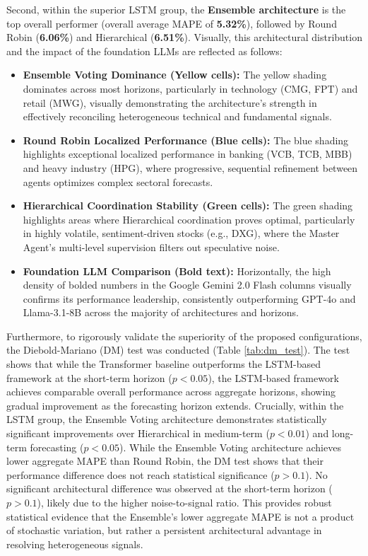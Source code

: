 \documentclass{ieeeaccess}
\begin{document}
Second, within the superior LSTM group, the \textbf{Ensemble architecture} is the top overall performer (overall average MAPE of \textbf{5.32\%}), followed by Round Robin (\textbf{6.06\%}) and Hierarchical (\textbf{6.51\%}). Visually, this architectural distribution and the impact of the foundation LLMs are reflected as follows:
\begin{itemize}
    \item \textbf{Ensemble Voting Dominance (Yellow cells):} The yellow shading dominates across most horizons, particularly in technology (CMG, FPT) and retail (MWG), visually demonstrating the architecture's strength in effectively reconciling heterogeneous technical and fundamental signals.
    \item \textbf{Round Robin Localized Performance (Blue cells):} The blue shading highlights exceptional localized performance in banking (VCB, TCB, MBB) and heavy industry (HPG), where progressive, sequential refinement between agents optimizes complex sectoral forecasts.
    \item \textbf{Hierarchical Coordination Stability (Green cells):} The green shading highlights areas where Hierarchical coordination proves optimal, particularly in highly volatile, sentiment-driven stocks (e.g., DXG), where the Master Agent's multi-level supervision filters out speculative noise.
    \item \textbf{Foundation LLM Comparison (Bold text):} Horizontally, the high density of bolded numbers in the Google Gemini 2.0 Flash columns visually confirms its performance leadership, consistently outperforming GPT-4o and Llama-3.1-8B across the majority of architectures and horizons.
\end{itemize}

Furthermore, to rigorously validate the superiority of the proposed configurations, the Diebold-Mariano (DM) test was conducted (Table \ref{tab:dm_test}). The test shows that while the Transformer baseline outperforms the LSTM-based framework at the short-term horizon ($p < 0.05$), the LSTM-based framework achieves comparable overall performance across aggregate horizons, showing gradual improvement as the forecasting horizon extends. Crucially, within the LSTM group, the Ensemble Voting architecture demonstrates statistically significant improvements over Hierarchical in medium-term ($p < 0.01$) and long-term forecasting ($p < 0.05$). While the Ensemble Voting architecture achieves lower aggregate MAPE than Round Robin, the DM test shows that their performance difference does not reach statistical significance ($p > 0.1$). No significant architectural difference was observed at the short-term horizon ($p > 0.1$), likely due to the higher noise-to-signal ratio. This provides robust statistical evidence that the Ensemble's lower aggregate MAPE is not a product of stochastic variation, but rather a persistent architectural advantage in resolving heterogeneous signals.
\end{document}

